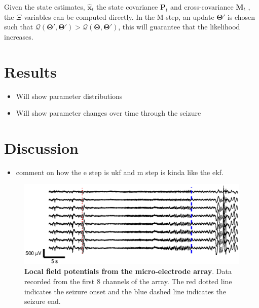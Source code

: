 \documentclass[]{article}
\begin{document}
Given the state estimates, $\mathbf {\hat x}_t$ the state covariance $\mathbf P_t$ and cross-covariance $\mathbf M_t$ , the $\Xi$-variables can be computed directly. In the M-step, an update $\boldsymbol\Theta'$ is chosen such that $\mathcal{Q}\left(\boldsymbol\Theta',\boldsymbol\Theta'\right)>\mathcal{Q}\left(\boldsymbol\Theta,\boldsymbol\Theta'\right)$, this will guarantee that the likelihood increases. 



\section{Results}
\begin{itemize}
	\item Will show parameter distributions
	\item Will show parameter changes over time through the seizure
\end{itemize}


\section{Discussion}

\begin{itemize}
	\item comment on how the e step is ukf and m step is kinda like the ekf.  
\end{itemize}

\begin{figure}[!ht]
\begin{center}
\includegraphics{./Figures/LFPs.eps}
\end{center}
\caption{{\bf Local field potentials from the micro-electrode array}. Data recorded from the first 8 channels of the array. The red dotted line indicates the seizure onset and the blue dashed line indicates the seizure end.}
\label{fig:TimeSeries}
\end{figure}
\end{document}
